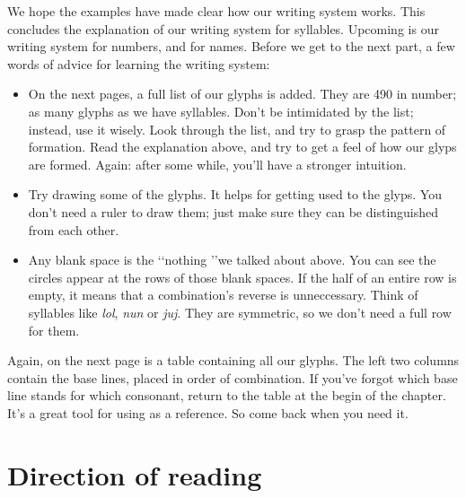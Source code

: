 We hope the examples have made clear how our writing system works. This concludes the explanation of our writing system for syllables. Upcoming is our writing system for numbers, and for names. Before we get to the next part, a few words of advice for learning the writing system:
\begin{itemize}
	\item On the next pages, a full list of our glyphs is added. They are 490 in number; as many glyphs as we have syllables. Don't be intimidated by the list; instead, use it wisely. Look through the list, and try to grasp the pattern of formation. Read the explanation above, and try to get a feel of how our glyps are formed. Again: after some while, you'll have a stronger intuition. 
	\item Try drawing some of the glyphs. It helps for getting used to the glyps. You don't need a ruler to draw them; just make sure they can be distinguished from each other. 
	\item Any blank space is the \lq\lq nothing \rq\rq we talked about above. You can see the circles appear at the rows of those blank spaces. If the half of an entire row is empty, it means that a combination's reverse is unneccessary. Think of syllables like {\it lol}, {\it nun} or {\it juj}. They are symmetric, so we don't need a full row for them. 
\end{itemize}

\noindent Again, on the next page is a table containing all our glyphs. The left two columns contain the base lines, placed in order of combination. If you've forgot which base line stands for which consonant, return to the table at the begin of the chapter. It's a great tool for using as a reference. So come back when you need it.  

\vfill

%
\pagebreak
{}
\pagebreak

\restoregeometry
\pagebreak
{}


\restoregeometry
\section{Direction of reading }


